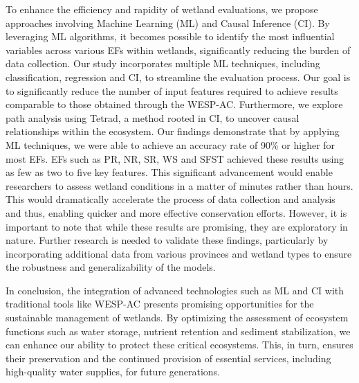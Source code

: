 \documentclass[12pt,letterpaper]{article}
\begin{document}
To enhance the efficiency and rapidity of wetland evaluations, we propose approaches involving Machine Learning (\ac{ML}) and Causal Inference (\ac{CI}).
By leveraging \ac{ML} algorithms, it becomes possible to identify the most influential variables across various \acp{EF} within wetlands, significantly reducing the burden of data collection.
Our study incorporates multiple \ac{ML} techniques, including classification, regression and \ac{CI}, to streamline the evaluation process. 
Our goal is to significantly reduce the number of input features required to achieve results comparable to those obtained through the \ac{WESP-AC}.
Furthermore, we explore path analysis using Tetrad, a method rooted in \ac{CI}, to uncover causal relationships within the ecosystem.
Our findings demonstrate that by applying \ac{ML} techniques, we were able to achieve an accuracy rate of 90\% or higher for most \acp{EF}.
\ac{EF}s such as \ac{PR}, \ac{NR}, \ac{SR}, \ac{WS} and \ac{SFST} achieved these results using as few as two to five key features.
This significant advancement would enable researchers to assess wetland conditions in a matter of minutes rather than hours.
This would dramatically accelerate the process of data collection and analysis and thus, enabling quicker and more effective conservation efforts.
However, it is important to note that while these results are promising, they are exploratory in nature.
Further research is needed to validate these findings, particularly by incorporating additional data from various provinces and wetland types to ensure the robustness and generalizability of the models.

In conclusion, the integration of advanced technologies such as \ac{ML} and \ac{CI} with traditional tools like \ac{WESP-AC} presents promising opportunities for the sustainable management of wetlands.
By optimizing the assessment of ecosystem functions such as water storage, nutrient retention and sediment stabilization, we can enhance our ability to protect these critical ecosystems.
This, in turn, ensures their preservation and the continued provision of essential services, including high-quality water supplies, for future generations.
\end{document}
